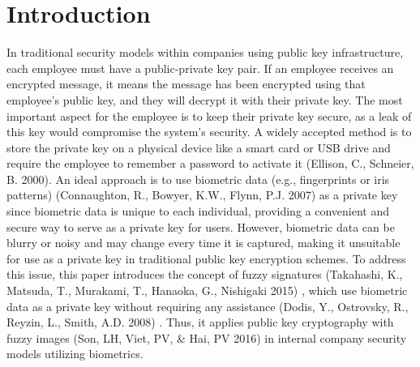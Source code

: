 \documentclass[graybox]{svmult}
\begin{document}
\section{Introduction}
In traditional security models within companies using public key infrastructure, each employee must have a public-private key pair. If an employee receives an encrypted message, it means the message has been encrypted using that employee's public key, and they will decrypt it with their private key. The most important aspect for the employee is to keep their private key secure, as a leak of this key would compromise the system's security. A widely accepted method is to store the private key on a physical device like a smart card or USB drive and require the employee to remember a password to activate it 
(Ellison, C., Schneier, B. 2000).
An ideal approach is to use biometric data (e.g., fingerprints or iris patterns) 
(Connaughton, R., Bowyer, K.W., Flynn, P.J. 2007)
as a private key since biometric data is unique to each individual, providing a convenient and secure way to serve as a private key for users. However, biometric data can be blurry or noisy and may change every time it is captured, making it unsuitable for use as a private key in traditional public key encryption schemes.
To address this issue, this paper introduces the concept of fuzzy signatures 
(Takahashi, K., Matsuda, T., Murakami, T., Hanaoka, G., Nishigaki 2015)
, which use biometric data as a private key without requiring any assistance 
 (Dodis, Y., Ostrovsky, R., Reyzin, L., Smith, 
A.D. 2008)
. Thus, it applies public key cryptography with fuzzy images 
(Son, LH, Viet, PV, \& Hai, PV 2016)
in internal company security models utilizing biometrics.
\end{document}
